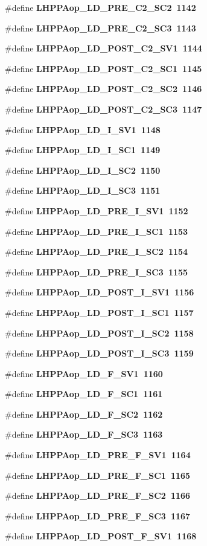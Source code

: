 \begin{CompactItemize}
\item 
\#define \bf{LHPPAop\_\-LD\_\-PRE\_\-C2\_\-SC2}~1142
\item 
\#define \bf{LHPPAop\_\-LD\_\-PRE\_\-C2\_\-SC3}~1143
\item 
\#define \bf{LHPPAop\_\-LD\_\-POST\_\-C2\_\-SV1}~1144
\item 
\#define \bf{LHPPAop\_\-LD\_\-POST\_\-C2\_\-SC1}~1145
\item 
\#define \bf{LHPPAop\_\-LD\_\-POST\_\-C2\_\-SC2}~1146
\item 
\#define \bf{LHPPAop\_\-LD\_\-POST\_\-C2\_\-SC3}~1147
\item 
\#define \bf{LHPPAop\_\-LD\_\-I\_\-SV1}~1148
\item 
\#define \bf{LHPPAop\_\-LD\_\-I\_\-SC1}~1149
\item 
\#define \bf{LHPPAop\_\-LD\_\-I\_\-SC2}~1150
\item 
\#define \bf{LHPPAop\_\-LD\_\-I\_\-SC3}~1151
\item 
\#define \bf{LHPPAop\_\-LD\_\-PRE\_\-I\_\-SV1}~1152
\item 
\#define \bf{LHPPAop\_\-LD\_\-PRE\_\-I\_\-SC1}~1153
\item 
\#define \bf{LHPPAop\_\-LD\_\-PRE\_\-I\_\-SC2}~1154
\item 
\#define \bf{LHPPAop\_\-LD\_\-PRE\_\-I\_\-SC3}~1155
\item 
\#define \bf{LHPPAop\_\-LD\_\-POST\_\-I\_\-SV1}~1156
\item 
\#define \bf{LHPPAop\_\-LD\_\-POST\_\-I\_\-SC1}~1157
\item 
\#define \bf{LHPPAop\_\-LD\_\-POST\_\-I\_\-SC2}~1158
\item 
\#define \bf{LHPPAop\_\-LD\_\-POST\_\-I\_\-SC3}~1159
\item 
\#define \bf{LHPPAop\_\-LD\_\-F\_\-SV1}~1160
\item 
\#define \bf{LHPPAop\_\-LD\_\-F\_\-SC1}~1161
\item 
\#define \bf{LHPPAop\_\-LD\_\-F\_\-SC2}~1162
\item 
\#define \bf{LHPPAop\_\-LD\_\-F\_\-SC3}~1163
\item 
\#define \bf{LHPPAop\_\-LD\_\-PRE\_\-F\_\-SV1}~1164
\item 
\#define \bf{LHPPAop\_\-LD\_\-PRE\_\-F\_\-SC1}~1165
\item 
\#define \bf{LHPPAop\_\-LD\_\-PRE\_\-F\_\-SC2}~1166
\item 
\#define \bf{LHPPAop\_\-LD\_\-PRE\_\-F\_\-SC3}~1167
\item 
\#define \bf{LHPPAop\_\-LD\_\-POST\_\-F\_\-SV1}~1168

\end{CompactItemize}

